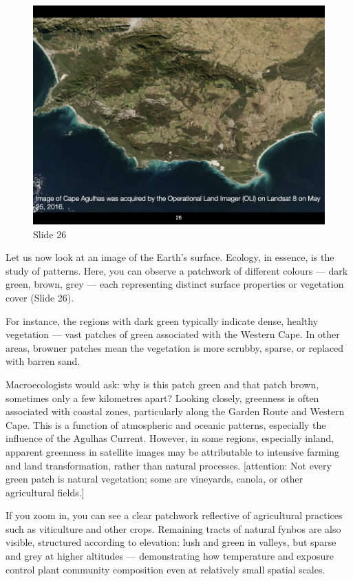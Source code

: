 \documentclass[
  11pt,
]{book}
\begin{document}
\begin{figure}[ht]
\centering
\includegraphics[width=0.8\linewidth]{../images/BDC334/BDC334-026.jpeg}
\caption*{Slide 26}
\end{figure}

Let us now look at an image of the Earth's surface. Ecology, in essence,
is the study of patterns. Here, you can observe a patchwork of different
colours --- dark green, brown, grey --- each representing distinct
surface properties or vegetation cover (Slide 26).

For instance, the regions with dark green typically indicate dense,
healthy vegetation --- vast patches of green associated with the Western
Cape. In other areas, browner patches mean the vegetation is more
scrubby, sparse, or replaced with barren sand.

Macroecologists would ask: why is this patch green and that patch brown,
sometimes only a few kilometres apart? Looking closely, greenness is
often associated with coastal zones, particularly along the Garden Route
and Western Cape. This is a function of atmospheric and oceanic
patterns, especially the influence of the Agulhas Current. However, in
some regions, especially inland, apparent greenness in satellite images
may be attributable to intensive farming and land transformation, rather
than natural processes. {[}attention: Not every green patch is natural
vegetation; some are vineyards, canola, or other agricultural fields.{]}

If you zoom in, you can see a clear patchwork reflective of agricultural
practices such as viticulture and other crops. Remaining tracts of
natural fynbos are also visible, structured according to elevation: lush
and green in valleys, but sparse and grey at higher altitudes ---
demonstrating how temperature and exposure control plant community
composition even at relatively small spatial scales.
\end{document}
